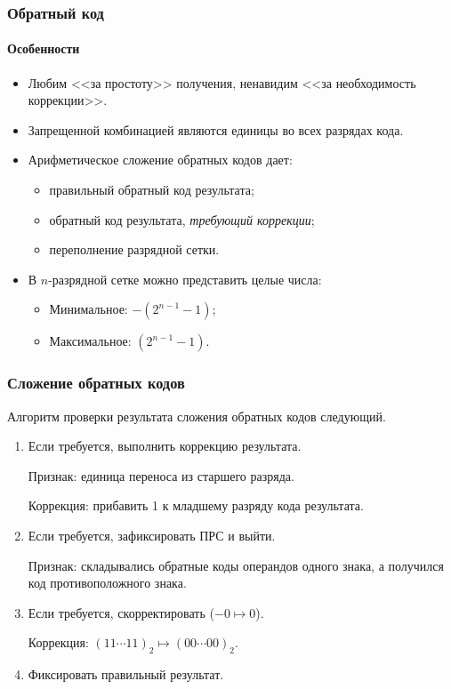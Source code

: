 \begin{frame}
    \frametitle{Обратный код}
    \framesubtitle{Особенности}

    \begin{itemize}
        \item Любим <<за простоту>> получения, ненавидим <<за необходимость коррекции>>.
        \item Запрещенной комбинацией являются единицы во всех разрядах кода.
        \item Арифметическое сложение обратных кодов дает: 
        \begin{itemize}
            \item правильный обратный код результата;
            \item обратный код результата, \emph{требующий коррекции};
            \item переполнение разрядной сетки.
        \end{itemize}
        \item В $n$-разрядной сетке можно представить целые числа:
        \begin{itemize}
            \item Минимальное: $-(2^{n-1} - 1)$;
            \item Максимальное: $(2^{n-1} - 1)$.
        \end{itemize}
    \end{itemize}
\end{frame}

\begin{frame}
    \frametitle{Сложение обратных кодов}

    Алгоритм проверки результата сложения обратных кодов следующий.
    \begin{enumerate}
        \item Если требуется, выполнить коррекцию результата.
        \begin{block}{}
            Признак: единица переноса из старшего разряда.
            
            Коррекция: прибавить 1 к младшему разряду кода результата.
        \end{block}
        \item Если требуется, зафиксировать ПРС и выйти.
        \begin{block}{}
            Признак: складывались обратные коды операндов одного знака, а получился код противоположного знака.
        \end{block}
        \item Если требуется, скорректировать ($-0\mapsto 0$).
        \begin{block}{}
            Коррекция: $(11\cdots 11)_2\mapsto (00\cdots 00)_2$.
        \end{block}
        \item Фиксировать правильный результат.
    \end{enumerate}
\end{frame}

